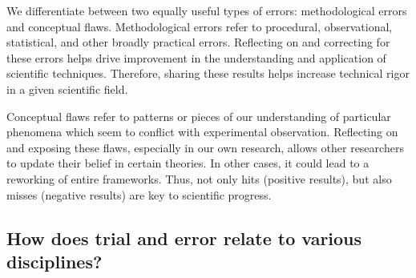 \documentclass[twocolumn, serif, editorial, authordate]{jote-article}
\begin{document}
We differentiate between two equally useful types of errors: methodological errors and conceptual flaws. Methodological errors refer to procedural, observational, statistical, and other broadly practical errors. Reflecting on and correcting for these errors helps drive improvement in the understanding and application of scientific techniques. Therefore, sharing these results helps increase technical rigor in a given scientific field.

Conceptual flaws refer to patterns or pieces of our understanding of particular phenomena which seem to conflict with experimental observation. Reflecting on and exposing these flaws, especially in our own research, allows other researchers to update their belief in certain theories. In other cases, it could lead to a reworking of entire frameworks. Thus, not only hits (positive results), but also misses (negative results) are key to scientific progress.

 {}\subsection*{How does trial and error relate to various disciplines?}
\end{document}
